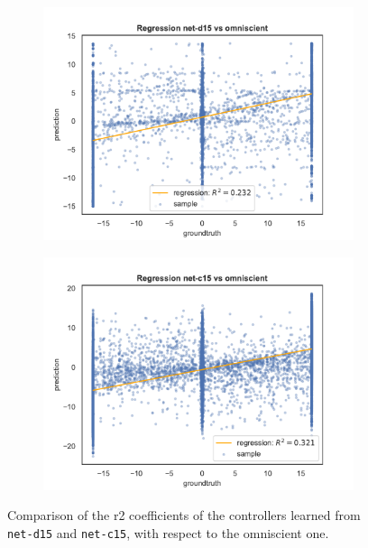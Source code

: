 \begin{figure}[!htb]
	\begin{center}
		\begin{subfigure}[h]{0.49\textwidth}
			\includegraphics[width=\textwidth]{contents/images/net-d15/regression-net-d15-vs-omniscient}%
		\end{subfigure}
		\hfill\vspace{-0.5cm}
		\begin{subfigure}[h]{0.49\textwidth}
			\includegraphics[width=\textwidth]{contents/images/net-c15/regression-net-c15-vs-omniscient}%
		\end{subfigure}
	\end{center}
	\caption[Evaluation of the \gls{r2} coefficients of \texttt{net-c15}.]{Comparison 
		of the \gls{r2} coefficients of the controllers learned from 
		\texttt{net-d15} and \texttt{net-c15}, with respect to the omniscient one.}
	\label{fig:net-c15r2}
\end{figure}

